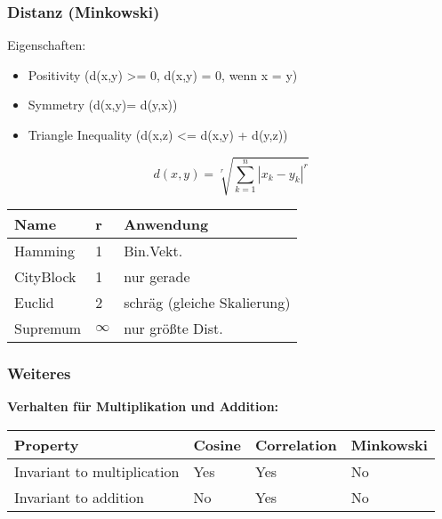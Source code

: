 \documentclass[a4paper]{article}
\begin{document}
\begin{landscape}
\begin{multicols}{3}
            \subsubsection{Distanz (Minkowski)}

            Eigenschaften:
            \begin{itemize}[noitemsep,nolistsep]
                \item Positivity (d(x,y) >= 0, d(x,y) = 0, wenn x = y)
                \item Symmetry (d(x,y)= d(y,x))
                \item Triangle Inequality (d(x,z) <= d(x,y) + d(y,z))
            \end{itemize}
            
            $$ d(x,y) =  \sqrt[r]{\sum^{n}_{k=1} | x_k - y_k |^r} $$

            \begin{center}
                
                \begin{tabular}{|l|l|l|}
                \hline
                Name      & r   & Anwendung                                                                                            \\ \hline
                Hamming   & 1   & Bin.Vekt. \\ \hline
                CityBlock & 1   &  nur gerade                                                                                                    \\ \hline
                Euclid    & 2   &  schräg  (gleiche Skalierung)                                                                                                  \\ \hline
                Supremum  & $\infty$ &  nur größte Dist.                                                                                                 \\ \hline
                \end{tabular}
            \end{center}

            \subsubsection{Weiteres}

            \textbf{Verhalten für Multiplikation und Addition:}
            \begin{center}
            \begin{tabular}{|l|l|l|l|}
                \hline
                Property                    & Cosine & Correlation & Minkowski \\ \hline
                Invariant to multiplication & Yes    & Yes         & No        \\ \hline
                Invariant to addition   & No     & Yes         & No        \\ \hline
                \end{tabular}
            \end{center}
        

\end{multicols}
\end{landscape}
\end{document}

